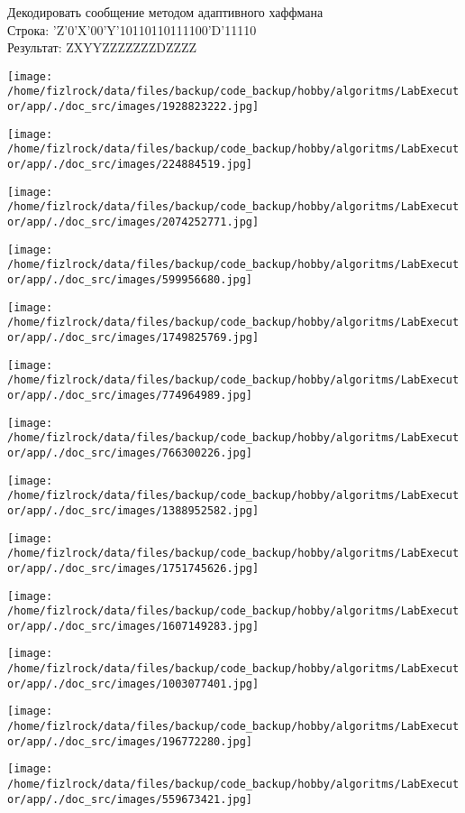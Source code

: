\documentclass[a4paper, 12pt]{article}
\begin{document}
Декодировать сообщение методом адаптивного хаффмана \\
Строка: 
'Z'0'X'00'Y'10110110111100'D'11110\\
Результат: ZXYYZZZZZZZDZZZZ

\texttt{[image: /home/fizlrock/data/files/backup/code\_backup/hobby/algoritms/LabExecutor/app/./doc\_src/images/1928823222.jpg]}

\texttt{[image: /home/fizlrock/data/files/backup/code\_backup/hobby/algoritms/LabExecutor/app/./doc\_src/images/224884519.jpg]}

\texttt{[image: /home/fizlrock/data/files/backup/code\_backup/hobby/algoritms/LabExecutor/app/./doc\_src/images/2074252771.jpg]}

\texttt{[image: /home/fizlrock/data/files/backup/code\_backup/hobby/algoritms/LabExecutor/app/./doc\_src/images/599956680.jpg]}

\texttt{[image: /home/fizlrock/data/files/backup/code\_backup/hobby/algoritms/LabExecutor/app/./doc\_src/images/1749825769.jpg]}

\texttt{[image: /home/fizlrock/data/files/backup/code\_backup/hobby/algoritms/LabExecutor/app/./doc\_src/images/774964989.jpg]}

\texttt{[image: /home/fizlrock/data/files/backup/code\_backup/hobby/algoritms/LabExecutor/app/./doc\_src/images/766300226.jpg]}

\texttt{[image: /home/fizlrock/data/files/backup/code\_backup/hobby/algoritms/LabExecutor/app/./doc\_src/images/1388952582.jpg]}

\texttt{[image: /home/fizlrock/data/files/backup/code\_backup/hobby/algoritms/LabExecutor/app/./doc\_src/images/1751745626.jpg]}

\texttt{[image: /home/fizlrock/data/files/backup/code\_backup/hobby/algoritms/LabExecutor/app/./doc\_src/images/1607149283.jpg]}

\texttt{[image: /home/fizlrock/data/files/backup/code\_backup/hobby/algoritms/LabExecutor/app/./doc\_src/images/1003077401.jpg]}

\texttt{[image: /home/fizlrock/data/files/backup/code\_backup/hobby/algoritms/LabExecutor/app/./doc\_src/images/196772280.jpg]}

\texttt{[image: /home/fizlrock/data/files/backup/code\_backup/hobby/algoritms/LabExecutor/app/./doc\_src/images/559673421.jpg]}
\end{document}
